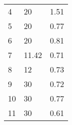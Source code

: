 \documentclass[oneside,onecolumn]{article}
\begin{document}
\begin{table}[]
\begin{tabular}{lll}
4                                                                                       & 20                                                                                                      & 1.51                                                                                   \\
5                                                                                       & 20                                                                                                      & 0.77                                                                                   \\
6                                                                                       & 20                                                                                                      & 0.81                                                                                   \\
7                                                                                       & 11.42                                                                                                   & 0.71                                                                                   \\
8                                                                                       & 12                                                                                                      & 0.73                                                                                   \\
9                                                                                       & 30                                                                                                      & 0.72                                                                                   \\
10                                                                                      & 30                                                                                                      & 0.77                                                                                   \\
11                                                                                      & 30                                                                                                      & 0.61                                                                                   \\

\end{tabular}
\end{table}
\end{document}
